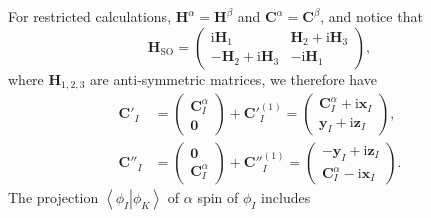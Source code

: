 \documentclass[a4paper,11pt,twoside,openright]{book}
\begin{document}
For restricted calculations, $\mathbf{H}^{\alpha}=\mathbf{H}^{\beta}$ and $\mathbf{C}^{\alpha}=\mathbf{C}^{\beta}$,
and notice that
\begin{equation}
  \mathbf{H}_{\text{SO}}
  =\begin{pmatrix}
    \text{i}\mathbf{H}_{1} & \mathbf{H}_{2}+\text{i}\mathbf{H}_{3}\\
    -\mathbf{H}_{2}+\text{i}\mathbf{H}_{3} & -\text{i}\mathbf{H}_{1}
  \end{pmatrix},
\end{equation}
where $\mathbf{H}_{1,2,3}$ are anti-symmetric matrices, we therefore have
\begin{align}
  \mathbf{C}'_{I}
  &=\begin{pmatrix}
    \mathbf{C}^{\alpha}_{I}\\
    \mathbf{0}
  \end{pmatrix}+\mathbf{C}'^{(1)}_{I}
  =\begin{pmatrix}
    \mathbf{C}^{\alpha}_{I}+\text{i}\mathbf{x}_{I}\\
    \mathbf{y}_{I}+\text{i}\mathbf{z}_{I}
  \end{pmatrix},\\
  \mathbf{C}''_{I}
  &=\begin{pmatrix}
    \mathbf{0}\\
    \mathbf{C}^{\alpha}_{I}
  \end{pmatrix}+\mathbf{C}''^{(1)}_{I}
  =\begin{pmatrix}
    -\mathbf{y}_{I}+\text{i}\mathbf{z}_{I}\\
    \mathbf{C}^{\alpha}_{I}-\text{i}\mathbf{x}_{I}
  \end{pmatrix}.
\end{align}
The projection $\left\langle\left.\phi_{I}\right|\phi_{K}\right\rangle$ of $\alpha$ spin
of $\phi_{I}$ includes
\end{document}
